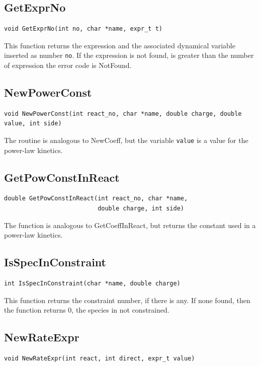 \subsection{GetExprNo}
\begin{verbatim} 
void GetExprNo(int no, char *name, expr_t t) 
\end{verbatim}

This function returns the expression and the associated dynamical
variable inserted as number {\tt no}.
If the expression is not found,  is greater than the 
number of expression the error code is NotFound.

\subsection{NewPowerConst}
\begin{verbatim}
void NewPowerConst(int react_no, char *name, double charge, double
value, int side)
\end{verbatim}

The routine is analogous to NewCoeff, but the variable {\tt value} is a value 
for the power-law kinetics.

\subsection{GetPowConstInReact}
\begin{verbatim}
double GetPowConstInReact(int react_no, char *name, 
                          double charge, int side)
\end{verbatim}

The function is analogous to GetCoeffInReact, but returns the constant
used in a power-law kinetics.

\subsection{IsSpecInConstraint}
\begin{verbatim}
int IsSpecInConstraint(char *name, double charge)
\end{verbatim}

This function returns the constraint number, if there is any. If none
found, then the function returns 0, \ie the species in not
constrained.

\subsection{NewRateExpr}
\begin{verbatim}
void NewRateExpr(int react, int direct, expr_t value)
\end{verbatim}

